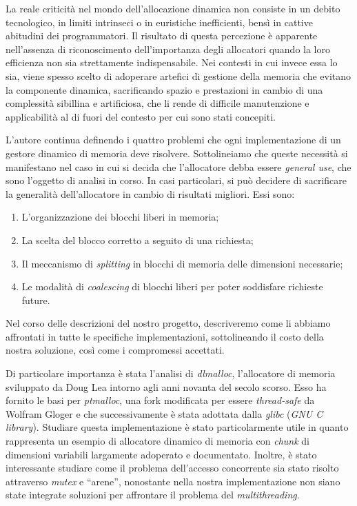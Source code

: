 La reale criticità nel mondo dell’allocazione dinamica non consiste in un debito tecnologico, in limiti intrinseci o in euristiche inefficienti, bensì in cattive abitudini dei programmatori. Il risultato di questa percezione è apparente nell’assenza di riconoscimento dell’importanza degli allocatori quando la loro efficienza non sia strettamente indispensabile. Nei contesti in cui invece essa lo sia, viene spesso scelto di adoperare artefici di gestione della memoria che evitano la componente dinamica, sacrificando spazio e prestazioni in cambio di una complessità sibillina e artificiosa, che li rende di difficile manutenzione e applicabilità al di fuori del contesto per cui sono stati concepiti.

L’autore continua definendo i quattro problemi che ogni implementazione di un gestore dinamico di memoria deve risolvere. Sottolineiamo che queste necessità si manifestano nel caso in cui si decida che l’allocatore debba essere \textit{general use}, che sono l’oggetto di analisi in corso. In casi particolari, si può decidere di sacrificare la generalità dell’allocatore in cambio di risultati migliori. Essi sono:
\begin{enumerate}
  \item L’organizzazione dei blocchi liberi in memoria;
  \item La scelta del blocco corretto a seguito di una richiesta;
  \item Il meccanismo di \textit{splitting} in blocchi di memoria delle dimensioni necessarie;
  \item Le modalità di \textit{coalescing} di blocchi liberi per poter soddisfare richieste future.
\end{enumerate}
Nel corso delle descrizioni del nostro progetto, descriveremo come li abbiamo affrontati in tutte le specifiche implementazioni, sottolineando il costo della nostra soluzione, così come i compromessi accettati.

Di particolare importanza è stata l’analisi di \textit{dlmalloc}, l’allocatore di memoria sviluppato da Doug Lea intorno agli anni novanta del secolo scorso. Esso ha fornito le basi per \textit{ptmalloc}, una fork modificata per essere \textit{thread-safe} da Wolfram Gloger e che successivamente è stata adottata dalla \textit{glibc} (\textit{GNU C library}). Studiare questa implementazione è stato particolarmente utile in quanto rappresenta un esempio di allocatore dinamico di memoria con \textit{chunk} di dimensioni variabili largamente adoperato e documentato. Inoltre, è stato interessante studiare come il problema dell’accesso concorrente sia stato risolto attraverso \textit{mutex} e ``arene'', nonostante nella nostra implementazione non siano state integrate soluzioni per affrontare il problema del \textit{multithreading}.

